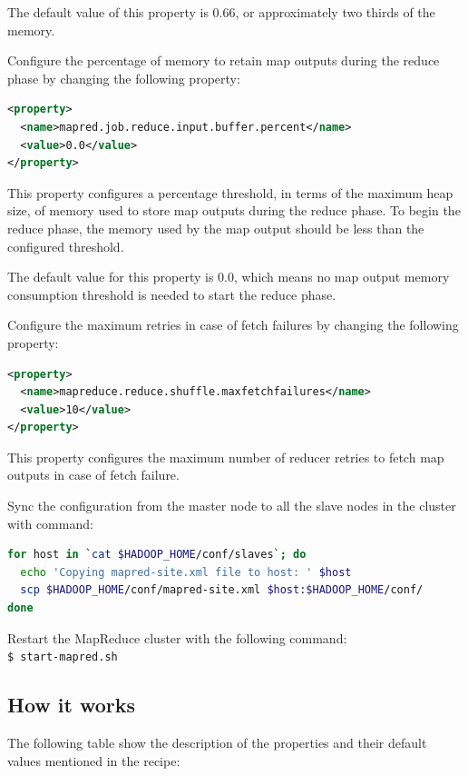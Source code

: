 The default value of this property is 0.66, or approximately two thirds of the memory.

Configure the percentage of memory to retain map outputs during the reduce phase by changing the following property:
\lstset{style=bashstyle}
\begin{lstlisting}[language=XML]
<property>
  <name>mapred.job.reduce.input.buffer.percent</name>
  <value>0.0</value>
</property>
\end{lstlisting}
This property configures a percentage threshold, in terms of the maximum heap size, of memory used to store map outputs during the reduce phase. To begin the reduce phase, the memory used by the map output should be less than the configured threshold.

The default value for this property is 0.0, which means no map output memory consumption threshold is needed to start the reduce phase.

Configure the maximum retries in case of fetch failures by changing the following property:
\lstset{style=bashstyle}
\begin{lstlisting}[language=XML]
<property>
  <name>mapreduce.reduce.shuffle.maxfetchfailures</name>
  <value>10</value>
</property>
\end{lstlisting}

This property configures the maximum number of reducer retries to fetch map outputs in case of fetch failure.

Sync the configuration from the master node to all the slave nodes in the cluster with command:
\lstset{style=bashstyle}
\begin{lstlisting}[language=bash]
for host in `cat $HADOOP_HOME/conf/slaves`; do
  echo 'Copying mapred-site.xml file to host: ' $host
  scp $HADOOP_HOME/conf/mapred-site.xml $host:$HADOOP_HOME/conf/
done
\end{lstlisting}

Restart the MapReduce cluster with the following command: \\
\verb|$ start-mapred.sh|

\subsection*{How it works}
The following table show the description of the properties and their default values mentioned in the recipe: \\

